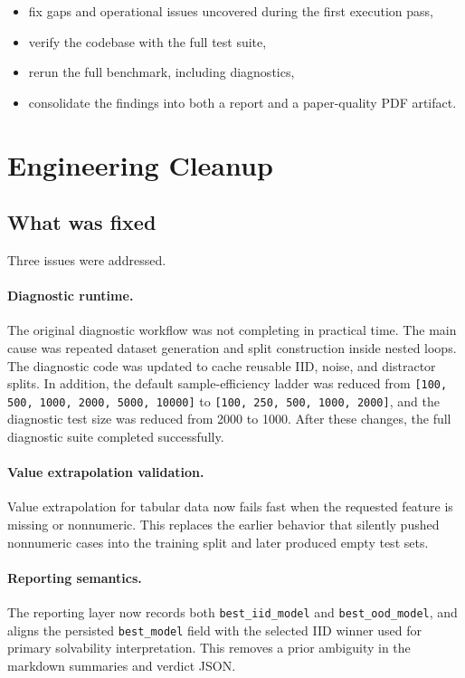\documentclass[11pt]{article}
\begin{document}
\begin{itemize}
  \item fix gaps and operational issues uncovered during the first execution pass,
  \item verify the codebase with the full test suite,
  \item rerun the full benchmark, including diagnostics,
  \item consolidate the findings into both a report and a paper-quality PDF artifact.
\end{itemize}

\section{Engineering Cleanup}

\subsection{What was fixed}

Three issues were addressed.

\paragraph{Diagnostic runtime.}
The original diagnostic workflow was not completing in practical time. The main cause was repeated dataset generation and split construction inside nested loops. The diagnostic code was updated to cache reusable IID, noise, and distractor splits. In addition, the default sample-efficiency ladder was reduced from \texttt{[100, 500, 1000, 2000, 5000, 10000]} to \texttt{[100, 250, 500, 1000, 2000]}, and the diagnostic test size was reduced from 2000 to 1000. After these changes, the full diagnostic suite completed successfully.

\paragraph{Value extrapolation validation.}
Value extrapolation for tabular data now fails fast when the requested feature is missing or nonnumeric. This replaces the earlier behavior that silently pushed nonnumeric cases into the training split and later produced empty test sets.

\paragraph{Reporting semantics.}
The reporting layer now records both \texttt{best\_iid\_model} and \texttt{best\_ood\_model}, and aligns the persisted \texttt{best\_model} field with the selected IID winner used for primary solvability interpretation. This removes a prior ambiguity in the markdown summaries and verdict JSON.
\end{document}
